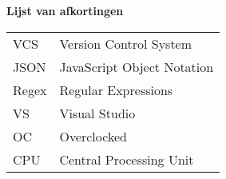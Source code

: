 \Large
\textbf{Lijst van afkortingen}
\newline
\small
\begin{table}[ht]
\small
\begin{tabular}{ll} 
VCS     & Version Control System \\
JSON    & JavaScript Object Notation \\
Regex   & Regular Expressions \\
VS      & Visual Studio \\
OC      & Overclocked \\
CPU     & Central Processing Unit \\
\end{tabular}
\end{table}

\newpage
